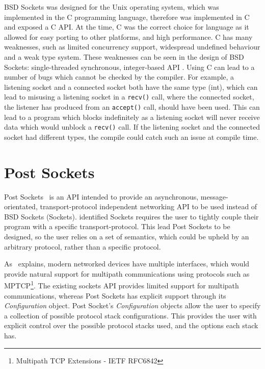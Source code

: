 BSD Sockets was designed for the Unix operating system, which was implemented in the C programming language, therefore
was implemented in C and exposed a C API.
At the time, C was the correct choice for language as it allowed for easy porting to other platforms, and high
performance.
C has many weaknesses, such as limited concurrency support, widespread undefined behaviour and a weak type system.
These weaknesses can be seen in the design of BSD Sockets: single-threaded synchronous, integer-based API .
Using C can lead to a number of bugs which cannot be checked by the compiler.
For example, a listening socket and a connected socket both have the same type (int), which can lead to misusing a
listening socket in a \texttt{recv()} call, where the connected socket, the listener has produced from an
\texttt{accept()} call, should have been used.
This can lead to a program which blocks indefinitely as a listening socket will never receive data which would unblock
a \texttt{recv()} call.
If the listening socket and the connected socket had different types, the compile could catch such an issue at compile
time.

\section{Post Sockets}\label{sec:post-sockets}
Post Sockets~\citep{kuhlewind_postsocketsabstract_} is an API intended to provide an asynchronous, message-orientated,
transport-protocol independent networking API to be used instead of BSD Sockets (Sockets).
\citet{kuhlewind_postsocketsabstract_} identified Sockets requires the user to tightly couple their program with a
specific transport-protocol.
This lead Post Sockets to be designed, so the user relies on a set of semantics, which could be upheld by an arbitrary
protocol, rather than a specific protocol.

As~\cite{kuhlewind_postsocketsabstract_} explains, modern networked devices have multiple interfaces, which would
provide natural support for multipath communications using protocols such as
MPTCP\footnote{Multipath TCP Extensions - IETF RFC6842}.
The existing sockets API provides limited support for multipath communications, whereas Post Sockets has explicit
support through its \emph{Configuration} object.
Post Socket's \emph{Configuration} objects allow the user to specify a collection of possible protocol stack
configurations.
This provides the user with explicit control over the possible protocol stacks used, and the options each stack has.

